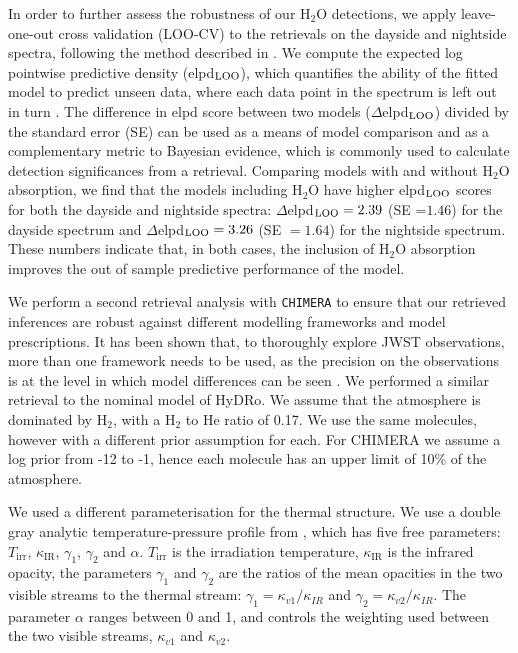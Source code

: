 \documentclass[pdflatex,sn-standardnature]{sn-jnl}%
\begin{document}
In order to further assess the robustness of our H$_2$O detections, we apply leave-one-out cross validation (LOO-CV) to the retrievals on the dayside and nightside spectra, following the method described in \citep{welbanks2022_loo}. We compute the expected log pointwise predictive density (elpd$_{\rm LOO}$), which quantifies the ability of the fitted model to predict unseen data, where each data point in the spectrum is left out in turn \citep{Vehtari2017}. The difference in elpd score between two models ($\Delta$elpd$_{\rm LOO}$) divided by the standard error (SE) can be used as a means of model comparison and as a complementary metric to Bayesian evidence, which is commonly used to calculate detection significances from a retrieval. Comparing models with and without H$_2$O absorption, we find that the models including H$_2$O have higher elpd$_{\rm LOO}$ scores for both the dayside and nightside spectra: $\Delta$elpd$_{\rm LOO}=2.39$ (SE =$1.46$) for the dayside spectrum and $\Delta$elpd$_{\rm LOO}=3.26$ (SE $=1.64$) for the nightside spectrum. These numbers indicate that, in both cases, the inclusion of H$_2$O absorption improves the out of sample predictive performance of the model.

We perform a second retrieval analysis with \texttt{CHIMERA} to ensure that our retrieved inferences are robust against different modelling frameworks and model prescriptions. It has been shown that, to thoroughly explore JWST observations, more than one framework needs to be used, as the precision on the observations is at the level in which model differences can be seen \citep{Barstow2020}. We performed a similar retrieval to the nominal model of HyDRo. We assume that the atmosphere is dominated by H$_2$, with a H$_2$ to He ratio of 0.17. We use the same molecules, however with a different prior assumption for each. For CHIMERA we assume a log prior from -12 to -1, hence each molecule has an upper limit of 10$\%$ of the atmosphere.  

We used a different parameterisation for the thermal structure. We use a double gray analytic temperature-pressure profile from  \cite{Parmentier2014}, which has five free parameters: $T_{\text{irr}}$, $\kappa_{\text{IR}}$, $\gamma_1$, $\gamma_2$ and $\alpha$. $T_{\text{irr}}$ is the irradiation temperature, $\kappa_{\text{IR}}$ is the infrared opacity, the parameters $\gamma_{1}$ and $\gamma_{2}$ are the ratios of the mean opacities in the two visible streams to the thermal stream: $\gamma_{1} = \kappa_{v1} / \kappa_{IR}$ and $\gamma_{2} = \kappa_{v2} / \kappa_{IR}$. The parameter $\alpha$ ranges between 0 and 1, and controls the weighting used between the two visible streams, $\kappa_{v1}$ and $\kappa_{v2}$. 
\end{document}
